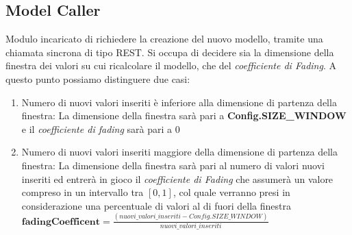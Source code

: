     \subsection{Model Caller}
      Modulo incaricato di richiedere la creazione del nuovo modello, tramite una chiamata sincrona di tipo REST. Si occupa di decidere sia la dimensione della finestra dei valori su cui ricalcolare il modello, che del \textit{coefficiente di Fading}. A questo punto possiamo distinguere due casi:
      \begin{enumerate}
        \item Numero di nuovi valori inseriti è inferiore alla dimensione di partenza della finestra:\newline
          La dimensione della finestra sarà pari a \textbf{Config.SIZE\_WINDOW} e il \textit{coefficiente di fading} sarà pari a 0
        \item Numero di nuovi valori inseriti maggiore della dimensione di partenza della finestra:\newline
          La dimensione della finestra sarà pari al numero di valori nuovi inseriti ed entrerà in gioco il \textit{coefficiente di Fading} che assumerà un valore compreso in un intervallo tra $[0,1]$, col quale verranno presi in considerazione una percentuale di valori al di fuori della finestra
          \begin{math}
            \textbf{fadingCoefficent} = \frac{(nuovi\_valori\_inseriti - Config.SIZE\_WINDOW)}{nuovi\_valori\_inseriti}
          \end{math}
      \end{enumerate}
      
